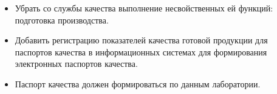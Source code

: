  \begin{itemize}
\item Убрать со службы качества выполнение несвойственных ей функций: подготовка производства. 

 \item Добавить регистрацию показателей качества готовой продукции для паспортов качества в информационных системах для формирования электронных паспортов качества.
 \item Паспорт качества должен формироваться по данным лаборатории.
\end{itemize}




